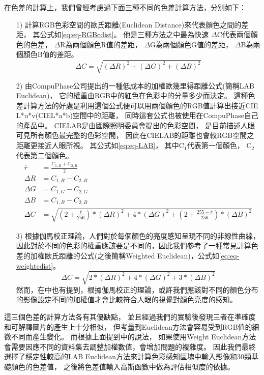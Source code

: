 \documentclass[class=NCU_thesis, crop=false]{standalone}
\begin{document}
	在色差的計算上，我們曾經考慮過下面三種不同的色差計算方法，分別如下：
	\begin{itemize}
	  \item [1)] 
	  	計算RGB色彩空間的歐氏距離(Euclidean Distance)來代表顏色之間的差距，
	  	其公式如\cref{eq:eq-RGBcdist}。
	  	他是三種方法之中最為快速
	  	$\Delta$C代表兩個顏色的色差，
	  	$\Delta$R為兩個顏色R值的差距，
	  	$\Delta$G為兩個顏色G值的差距，
	  	$\Delta$B為兩個顏色B值的差距。
	  	\begin{equation}
	    \label{eq:eq-RGBcdist}
	    	\Delta C = \sqrt{(\Delta R)^2 + (\Delta G)^2 + (\Delta B)^2}
		\end{equation}

	  \item [2)]
	  	由CompuPhase公司提出的一種低成本的加權歐幾里得距離公式\cite{LABformula}(簡稱LAB Euclidean)，
	  	它的權重由RGB中的紅色在色彩中的分量多少而決定。
	  	這種色差計算方法的好處是利用這個公式便可以用兩個顏色的RGB值計算出接近CIE L*u*v(CIEL*a*b)空間中的距離，
	  	同時這套公式也被使用在CompuPhase自己的產品中。
	  	CIELAB是由國際照明委員會提出的色彩空間，
	  	是目前描述人眼可見所有顏色最完整的色彩空間，
	  	因此在CIELAB的距離也會較RGB空間之距離更接近人眼所視。
	  	其公式如\cref{eq:eq-LAB}，
	  	其中C$_{1}$代表第一個顏色，
	  	C$_{2}$代表第二個顏色。
	  	\begin{equation}
	    \label{eq:eq-LAB}
	    \begin{split}
	    	\overline{r} & = \frac{C_{1,R} + C_{2,R}}{2} \\
	    	\Delta R & = C_{1,R} - C_{2,R} \\
	    	\Delta G & = C_{1,G} - C_{2,G} \\
	    	\Delta B & = C_{1,B} - C_{2,B} \\
	    	\Delta C & = \sqrt{(2 + \frac{\overline{r}}{256}) * (\Delta R)^2 + 4 * (\Delta G)^2 + (2 + \frac{255 - \overline{r}}{256}) * (\Delta B)^2}
	    \end{split}
		\end{equation}

	  \item [3)]
	  	根據伽馬校正理論，人們對於每個顏色的亮度感知呈現不同的非線性曲線，因此對於不同的色彩的權重應該要是不同的，因此我們參考了一種常見計算色差的加權歐氏距離的公式(之後簡稱Weighted Euclidean)，公式如\cref{eq:eq-weightcdist}。
	  	\begin{equation}
	    \label{eq:eq-weightcdist}
	    	\Delta C = \sqrt{2 * (\Delta R)^2 + 4 * (\Delta G)^2 + 3 * (\Delta B)^2}
		\end{equation}
		然而，在\cite{LABformula}中也有提到，根據伽馬校正的理論，或許我們應該對不同的顏色分布的影像設定不同的加權值才會比較符合人眼的視覺對顏色亮度的感知。
	\end{itemize}
	這三個色差的計算方法各有其優缺點，
	並且經過我們的實驗後發現三者在準確度和可解釋圖片的產生上十分相似，
	但考量到Euclidean方法會容易受到RGB值的細微不同而產生變化。
	而根據上面提到\cite{LABformula}中的說法，
	如果使用Weight Euclidean方法會需要因應不同的資料集去調整加權數值，會增加問題的複雜度。
	因此我們最終選擇了穩定性較高的LAB Euclidean方法來計算色彩感知區塊中輸入影像和30類基礎顏色的色差值，
	之後將色差值輸入高斯函數中做為評估相似度的依據。
\end{document}
